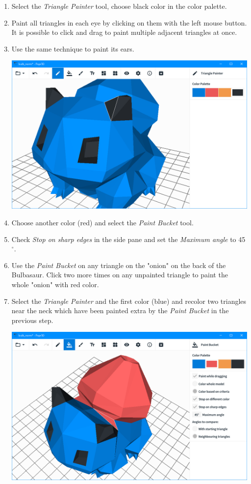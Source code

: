 \begin{enumerate}
\item Select the \textit{Triangle Painter} tool, choose black color in the color palette.
\item Paint all triangles in each eye by clicking on them with the left mouse button. It is possible to click and drag to paint multiple adjacent triangles at once.
\item Use the same technique to paint its ears.

\begin{center}
\includegraphics[scale=0.4]{images/bulb_eyes.png}
\end{center}

\item Choose another color (red) and select the \textit{Paint Bucket} tool.
\item Check \textit{Stop on sharp edges} in the side pane and set the \textit{Maximum angle} to 45$^\circ$.
\item Use the \textit{Paint Bucket} on any triangle on the "onion" on the back of the Bulbasaur. Click two more times on any unpainted triangle to paint the whole "onion" with red color.
\item Select the \textit{Triangle Painter} and the first color (blue) and recolor two triangles near the neck which have been painted extra by the \textit{Paint Bucket} in the previous step.

\begin{center}
\includegraphics[scale=0.4]{images/bulb_onion.png}
\end{center}


\end{enumerate}
